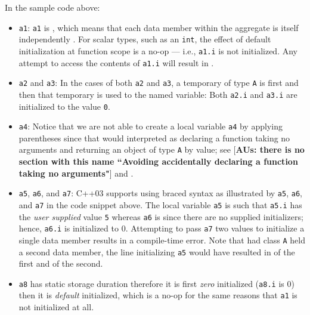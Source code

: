 \noindent In the sample code above:
\begin{itemize}
\item{\lstinline!a1!: \lstinline!a1! is , which means that each data member within the aggregate is itself independently . For scalar types, such as an \lstinline!int!, the effect of default initialization at function scope is a no-op — i.e., \lstinline!a1.i! is not initialized. Any attempt to access the contents of \lstinline!a1.i! will result in .}
\item{\lstinline!a2! and \lstinline!a3!: In the cases of both \lstinline!a2! and \lstinline!a3!, a temporary of type \lstinline!A! is first  and then that temporary is used to  the named variable: Both \lstinline!a2.i! and \lstinline!a3.i! are initialized to the value \lstinline!0!.}
\item{\lstinline!a4!: Notice that we are not able to create a  local variable \lstinline!a4! by applying parentheses since that would interpreted as declaring a function taking no arguments and returning an object of type \lstinline!A! by value; see  [\textbf{AUs: there is no section with this name ``Avoiding accidentally declaring a function taking no arguments"}]
and .}
\item{\lstinline!a5!, \lstinline!a6!, and \lstinline!a7!: C++03 supports  using braced syntax as illustrated by \lstinline!a5!, \lstinline!a6!, and \lstinline!a7! in the code snippet above. The local variable \lstinline!a5! is  such that \lstinline!a5.i! has the \emph{user supplied} value \lstinline!5! whereas \lstinline!a6! is  since there are no supplied initializers; hence, \lstinline!a6.i! is initialized to 0. Attempting to pass \lstinline!a7! two values to initialize a single data member results in a compile-time error. Note that had class \lstinline!A! held a second data member, the line initializing \lstinline!a5! would have resulted in  of the first and  of the second.}
\item{\lstinline!a8! has static storage duration therefore it is first \emph{zero} initialized (\lstinline!a8.i! is 0) then it is \emph{default} initialized, which is a no-op for the same reasons that \lstinline!a1! is not initialized at all.}
\end{itemize}


